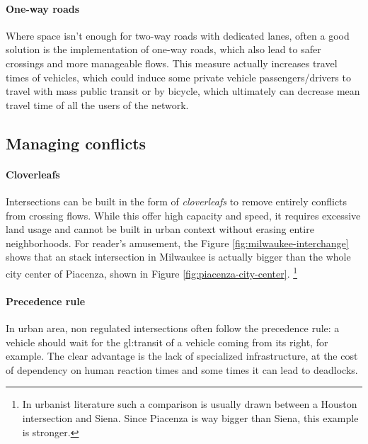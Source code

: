 \paragraph{One-way roads}

Where space isn't enough for two-way roads with dedicated lanes, often a good solution is the implementation of one-way roads, which also lead to safer crossings and more manageable flows. This measure actually increases travel times of vehicles, which could induce some private vehicle passengers/drivers to travel with mass public transit or by bicycle, which ultimately can decrease mean travel time of all the users of the network.

\subsection{Managing conflicts}

\paragraph{Cloverleafs}

Intersections can be built in the form of \textit{cloverleafs} to remove entirely conflicts from crossing flows. While this offer high capacity and speed, it requires excessive land usage and cannot be built in urban context without erasing entire neighborhoods. For reader's amusement, the Figure \ref{fig:milwaukee-interchange} shows that an stack intersection in Milwaukee is actually bigger than the whole city center of Piacenza, shown in Figure \ref{fig:piacenza-city-center}. \footnote{In urbanist literature such a comparison is usually drawn between a Houston intersection and Siena. Since Piacenza is way bigger than Siena, this example is stronger.}

\putimagecouple
{}
{}

\paragraph{Precedence rule}

In urban area, non regulated intersections often follow the precedence rule: a vehicle should wait for the \gls{gl:transit} of a vehicle coming from its right, for example. The clear advantage is the lack of specialized infrastructure, at the cost of dependency on human reaction times and some times it can lead to deadlocks.


